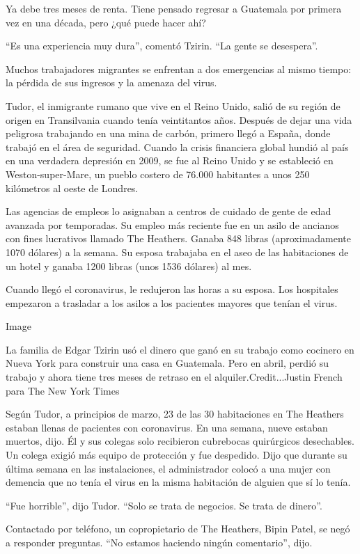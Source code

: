 Ya debe tres meses de renta. Tiene pensado regresar a Guatemala por
primera vez en una década, pero ¿qué puede hacer ahí?

``Es una experiencia muy dura'', comentó Tzirin. ``La gente se
desespera''.

Muchos trabajadores migrantes se enfrentan a dos emergencias al mismo
tiempo: la pérdida de sus ingresos y la amenaza del virus.

Tudor, el inmigrante rumano que vive en el Reino Unido, salió de su
región de origen en Transilvania cuando tenía veintitantos años. Después
de dejar una vida peligrosa trabajando en una mina de carbón, primero
llegó a España, donde trabajó en el área de seguridad. Cuando la crisis
financiera global hundió al país en una verdadera depresión en 2009, se
fue al Reino Unido y se estableció en Weston-super-Mare, un pueblo
costero de 76.000 habitantes a unos 250 kilómetros al oeste de Londres.

Las agencias de empleos lo asignaban a centros de cuidado de gente de
edad avanzada por temporadas. Su empleo más reciente fue en un asilo de
ancianos con fines lucrativos llamado The Heathers. Ganaba 848 libras
(aproximadamente 1070 dólares) a la semana. Su esposa trabajaba en el
aseo de las habitaciones de un hotel y ganaba 1200 libras (unos 1536
dólares) al mes.

Cuando llegó el coronavirus, le redujeron las horas a su esposa. Los
hospitales empezaron a trasladar a los asilos a los pacientes mayores
que tenían el virus.

Image

La familia de Edgar Tzirin usó el dinero que ganó en su trabajo como
cocinero en Nueva York para construir una casa en Guatemala. Pero en
abril, perdió su trabajo y ahora tiene tres meses de retraso en el
alquiler.Credit...Justin French para The New York Times

Según Tudor, a principios de marzo, 23 de las 30 habitaciones en The
Heathers estaban llenas de pacientes con coronavirus. En una semana,
nueve estaban muertos, dijo. Él y sus colegas solo recibieron cubrebocas
quirúrgicos desechables. Un colega exigió más equipo de protección y fue
despedido. Dijo que durante su última semana en las instalaciones, el
administrador colocó a una mujer con demencia que no tenía el virus en
la misma habitación de alguien que sí lo tenía.

``Fue horrible'', dijo Tudor. ``Solo se trata de negocios. Se trata de
dinero''.

Contactado por teléfono, un copropietario de The Heathers, Bipin Patel,
se negó a responder preguntas. ``No estamos haciendo ningún
comentario'', dijo.

